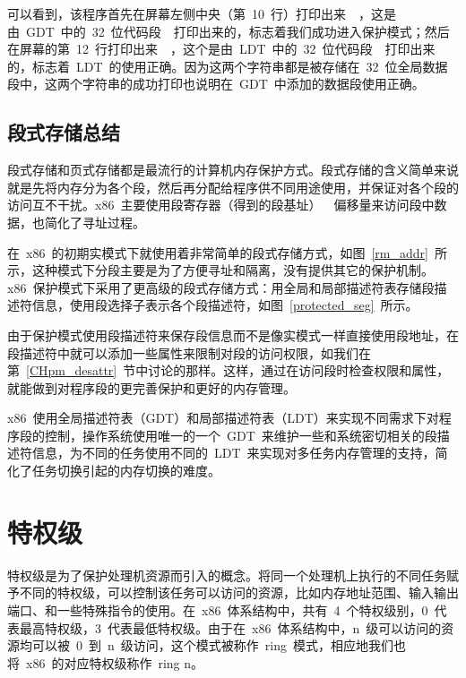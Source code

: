 可以看到，该程序首先在屏幕左侧中央（第~10~行）打印出来~~，这是由~GDT~中的~32~位代码段~~打印出来的，标志着我们成功进入保护模式；然后在屏幕的第~12~行打印出来~~，这个是由~LDT~中的~32~位代码段~~打印出来的，标志着~LDT~的使用正确。因为这两个字符串都是被存储在~32~位全局数据段中，这两个字符串的成功打印也说明在~GDT~中添加的数据段使用正确。

\subsection{段式存储总结}

段式存储和页式存储都是最流行的计算机内存保护方式。段式存储的含义简单来说就是先将内存分为各个段，然后再分配给程序供不同用途使用，并保证对各个段的访问互不干扰。x86~主要使用段寄存器（得到的段基址）~\code{+}~偏移量来访问段中数据，也简化了寻址过程。

在~x86~的初期实模式下就使用着非常简单的段式存储方式，如图~\ref{rm_addr}~所示，这种模式下分段主要是为了方便寻址和隔离，没有提供其它的保护机制。x86~保护模式下采用了更高级的段式存储方式：用全局和局部描述符表存储段描述符信息，使用段选择子表示各个段描述符，如图~\ref{protected_seg}~所示。

由于保护模式使用段描述符来保存段信息而不是像实模式一样直接使用段地址，在段描述符中就可以添加一些属性来限制对段的访问权限，如我们在第~\ref{CHpm_desattr}~节中讨论的那样。这样，通过在访问段时检查权限和属性，就能做到对程序段的更完善保护和更好的内存管理。

x86~使用全局描述符表（GDT）和局部描述符表（LDT）来实现不同需求下对程序段的控制，操作系统使用唯一的一个~GDT~来维护一些和系统密切相关的段描述符信息，为不同的任务使用不同的~LDT~来实现对多任务内存管理的支持，简化了任务切换引起的内存切换的难度。

\section{特权级}


特权级是为了保护处理机资源而引入的概念。将同一个处理机上执行的不同任务赋予不同的特权级，可以控制该任务可以访问的资源，比如内存地址范围、输入输出端口、和一些特殊指令的使用。在~x86~体系结构中，共有~4~个特权级别，0~代表最高特权级，3~代表最低特权级。由于在~x86~体系结构中，n~级可以访问的资源均可以被~0~到~n~级访问，这个模式被称作~ring~模式，相应地我们也将~x86~的对应特权级称作~ring n。

